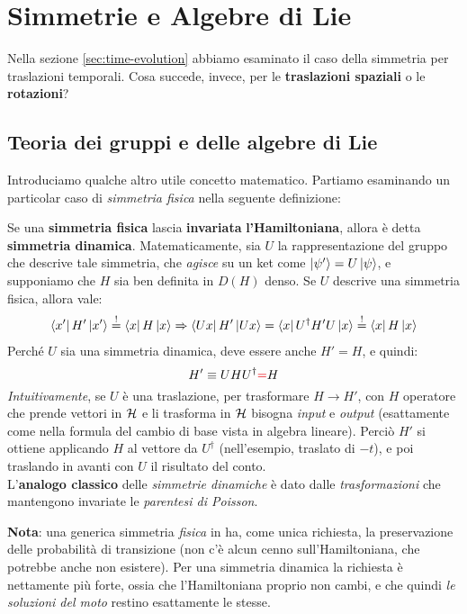 \documentclass[../../FisicaTeorica.tex]{subfiles}
\begin{document}
\section{Simmetrie e Algebre di Lie}
Nella sezione \ref{sec:time-evolution} abbiamo esaminato il caso della simmetria per traslazioni temporali.
Cosa succede, invece, per le \textbf{traslazioni spaziali} o le \textbf{rotazioni}?

\subsection{Teoria dei gruppi e delle algebre di Lie}
Introduciamo qualche altro utile concetto matematico.
Partiamo esaminando un particolar caso di \textit{simmetria fisica} nella seguente definizione:

\begin{dfn}
Se una \textbf{simmetria fisica} lascia \textbf{invariata} \textbf{l'Hamiltoniana}, allora è detta \textbf{simmetria dinamica}. Matematicamente, sia $U$ la rappresentazione del gruppo che descrive tale simmetria, che \textit{agisce} su un ket come $\Ket{\psi'} = U\Ket{\psi}$, e supponiamo che $H$ sia ben definita in $D(H)$ denso. Se $U$ descrive una simmetria fisica, allora vale:
\begin{align*}
\Bra{x'}H'\Ket{x'} \overset{!}{=} \Bra{x}H\Ket{x}\Rightarrow \Bra{Ux} H' \Ket{Ux}=\Bra{x}U^\dag H' U \Ket{x} \overset{!}{=} \Bra{x}H\Ket{x}
\end{align*}
Perché $U$ sia una simmetria dinamica, deve essere anche $H' = H$, e quindi:
\[
H' \equiv UHU^\dag \textcolor{Red}{=} H
\]
\textit{Intuitivamente}, se $U$ è una traslazione, per trasformare $H\to H'$, con $H$ operatore che prende vettori in $\mathcal{H}$ e li trasforma in $\mathcal{H}$ bisogna  \textit{input} e \textit{output} (esattamente come nella formula del cambio di base vista in algebra lineare). Perciò $H'$ si ottiene applicando $H$ al vettore  da $U^\dag$ (nell'esempio, traslato di $-t$), e poi traslando in avanti con $U$ il risultato del conto.\\

L'\textbf{analogo classico} delle \textit{simmetrie dinamiche} è dato dalle \textit{trasformazioni} che mantengono invariate le \textit{parentesi di Poisson}.
\end{dfn}
\textbf{Nota}: una generica simmetria \textit{fisica} in \MQ ha, come unica richiesta, la preservazione delle probabilità di transizione (non c'è alcun cenno sull'Hamiltoniana, che potrebbe anche non esistere). Per una simmetria dinamica la richiesta è nettamente più forte, ossia che l'Hamiltoniana proprio non cambi, e che quindi \textit{le soluzioni del moto} restino esattamente le stesse.\\
\end{document}
